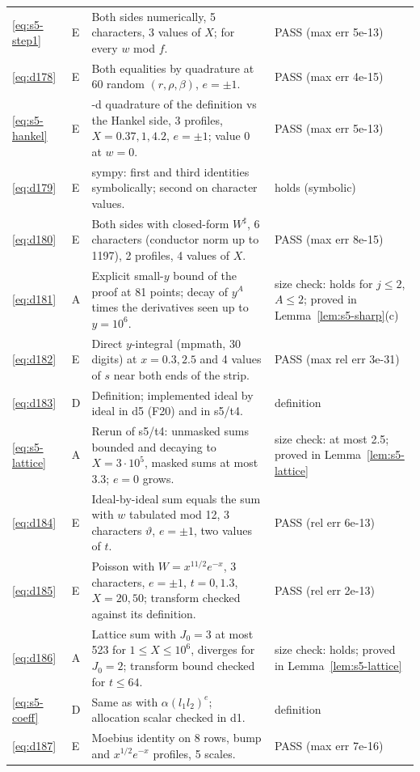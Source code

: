 \documentclass[11pt]{article}
\numberwithin{equation}{section}
\begin{document}
\begin{longtable}{@{}>{\raggedright\arraybackslash}p{1.2cm}>{\centering\arraybackslash}p{0.7cm}>{\raggedright\arraybackslash}p{9.05cm}>{\raggedright\arraybackslash}p{4.3cm}@{}}
\eqref{eq:s5-step1} & E & Both sides numerically, 5 characters, 3 values of $X$; \cite[Lemma~17]{QF} for every $w$ mod $f$. & PASS (max err 5e-13)\\
\eqref{eq:d178} & E & Both equalities by quadrature at 60 random $(r,\rho,\beta)$, $e=\pm1$. & PASS (max err 4e-15)\\
\eqref{eq:s5-hankel} & E & 2-d quadrature of the definition vs the Hankel side, 3 profiles, $X=0.37,1,4.2$, $e=\pm1$; value 0 at $w=0$. & PASS (max err 5e-13)\\
\eqref{eq:d179} & E & sympy: first and third identities symbolically; second on character values. & holds (symbolic)\\
\eqref{eq:d180} & E & Both sides with closed-form $W^\sharp$, 6 characters (conductor norm up to 1197), 2 profiles, 4 values of $X$. & PASS (max err 8e-15)\\
\eqref{eq:d181} & A & Explicit small-$y$ bound of the proof at 81 points; decay of $y^A$ times the derivatives seen up to $y=10^6$. & size check: holds for $j\le2$, $A\le2$; proved in Lemma~\ref{lem:s5-sharp}(c)\\
\eqref{eq:d182} & E & Direct $y$-integral (mpmath, 30 digits) at $x=0.3,2.5$ and 4 values of $s$ near both ends of the strip. & PASS (max rel err 3e-31)\\
\eqref{eq:d183} & D & Definition; implemented ideal by ideal in d5 (F20) and in s5/t4. & definition\\
\eqref{eq:s5-lattice} & A & Rerun of s5/t4: unmasked sums bounded and decaying to $X=3\cdot10^5$, masked sums at most 3.3; $e=0$ grows. & size check: at most 2.5; proved in Lemma~\ref{lem:s5-lattice}\\
\eqref{eq:d184} & E & Ideal-by-ideal sum equals the sum with $w$ tabulated mod 12, 3 characters $\vartheta$, $e=\pm1$, two values of $t$. & PASS (rel err 6e-13)\\
\eqref{eq:d185} & E & Poisson with $W=x^{11/2}e^{-x}$, 3 characters, $e=\pm1$, $t=0,1.3$, $X=20,50$; transform checked against its definition. & PASS (rel err 2e-13)\\
\eqref{eq:d186} & A & Lattice sum with $J_0=3$ at most 523 for $1\le X\le10^6$, diverges for $J_0=2$; transform bound checked for $t\le64$. & size check: holds; proved in Lemma~\ref{lem:s5-lattice}\\
\eqref{eq:s5-coeff} & D & Same as \cite[eq.~(18.18)]{OAI78} with $\alpha(l_1l_2)^e$; allocation scalar checked in d1. & definition\\
\eqref{eq:d187} & E & Moebius identity on 8 rows, bump and $x^{1/2}e^{-x}$ profiles, 5 scales. & PASS (max err 7e-16)\\

\end{longtable}
\end{document}
